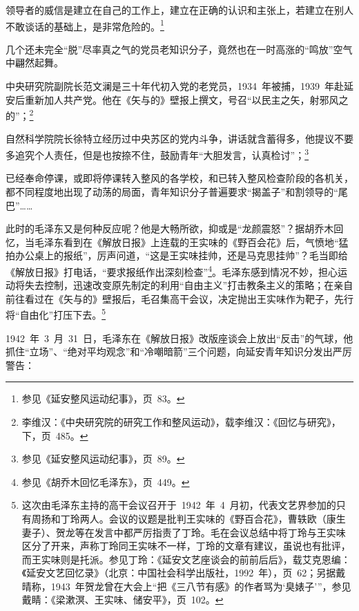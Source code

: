 \begin{quoting}
领导者的威信是建立在自己的工作上，建立在正确的认识和主张上，若建立在别人不敢谈话的基础上，是非常危险的。\footnote{参见《延安整风运动纪事》，页~83。}
\end{quoting}
几个还未完全“脱”尽率真之气的党员老知识分子，竟然也在一时高涨的“鸣放”空气中翩然起舞。

中央研究院副院长范文澜是三十年代初入党的老党员，1934~年被捕，1939~年赴延安后重新加人共产党。他在《矢与的》壁报上撰文，号召“以民主之矢，射邪风之的”；\footnote{李维汉：《中央研究院的研究工作和整风运动》，载李维汉：《回忆与研究》，下，页~485。}

自然科学院院长徐特立经历过中央苏区的党内斗争，讲话就含蓄得多，他提议不要多追究个人责任，但是也按捺不住，鼓励青年“大胆发言，认真检讨”；\footnote{参见《延安整风运动纪事》，页~89。}

已经奉命停课，或即将停课转入整风的各学校，和已转入整风检查阶段的各机关，都不同程度地出现了动荡的局面，青年知识分子普遍要求“揭盖子”和割领导的“尾巴”……

此时的毛泽东又是何种反应呢？他是大畅所欲，抑或是“龙颜震怒”？据胡乔木回忆，当毛泽东看到在《解放日报》上连载的王实味的《野百会花》后，气愤地“猛拍办公桌上的报纸”，厉声问道，“这是王实味挂帅，还是马克思挂帅”？毛当即给《解放日报》打电话，“要求报纸作出深刻检查”\footnote{参见《胡乔木回忆毛泽东》，页~449。}。毛泽东感到情况不妙，担心运动将失去控制，迅速改变原先制定的利用“自由主义”打击教条主义的策略；在亲自前往看过在《矢与的》壁报后，毛召集高干会议，决定抛出王实味作为靶子，先行将“自由化”打压下去。\footnote{这次由毛泽东主持的高干会议召开于~1942~年~4~月初，代表文艺界参加的只有周扬和丁玲两人。会议的议题是批判王实味的《野百合花》，曹轶欧（康生妻子）、贺龙等在发言中都严厉指责了丁玲。毛在会议总结中将丁玲与王实味区分了开来，声称丁玲同王实味不一样，丁玲的文章有建议，虽说也有批评，而王实味则是托派。参见丁玲：《延安文艺座谈会的前前后后》，载艾克恩编：《延安文艺回忆录》（北京：中国社会科学出版社，1992~年），页~62；另据戴晴称，1943~年贺龙曾在大会上“把《三八节有感》的作者骂为‘臭婊子’”，参见戴睛：《梁漱溟、王实味、储安平》，页~102。}

1942~年~3~月~31~日，毛泽东在《解放日报》改版座谈会上放出“反击”的气球，他抓住“立场”、“绝对平均观念”和“冷嘲暗箭”三个问题，向延安青年知识分发出严厉警告：

